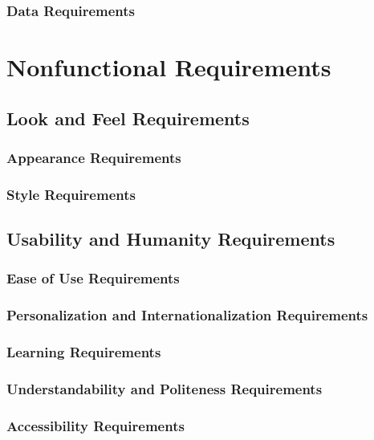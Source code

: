 \documentclass{scrreprt}
\begin{document}
\subsection{Data Requirements}

\chapter{Nonfunctional Requirements}

\section{Look and Feel Requirements}

\subsection{Appearance Requirements}

\subsection{Style Requirements}

\section{Usability and Humanity Requirements}

\subsection{Ease of Use Requirements}

\subsection{Personalization and Internationalization Requirements}

\subsection{Learning Requirements}

\subsection{Understandability and Politeness Requirements}

\subsection{Accessibility Requirements}
\end{document}
